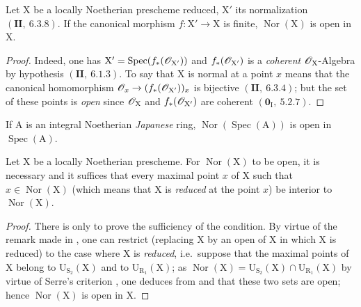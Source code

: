 \begin{proposition}[6.13.2]
\label{IV.6.13.2}
Let $\mathrm{X}$ be a locally Noetherian prescheme reduced, $\mathrm{X}'$ its
normalization $(\mathbf{II},~6.3.8)$. If the canonical morphism $f:\mathrm{X}'\to\mathrm{X}$ is finite, $\operatorname{Nor}(\mathrm{X})$ is open in $\mathrm{X}$.
\end{proposition}

\begin{proof}
Indeed, one has $\mathrm{X}'=\operatorname{Spec}(f_*(\mathscr{O}_{\mathrm{X}'}))$ and $f_*(\mathscr{O}_{\mathrm{X}'})$ is a \emph{coherent} $\mathscr{O}_\mathrm{X}$-Algebra by
hypothesis $(\mathbf{II},~6.1.3)$. To say that $\mathrm{X}$ is normal at a point $x$ means that the canonical
homomorphism $\mathscr{O}_x\to(f_*(\mathscr{O}_{\mathrm{X}'}))_x$ is bijective $(\mathbf{II},~6.3.4)$; but the set of these points is \emph{open}
since $\mathscr{O}_\mathrm{X}$ and $f_*(\mathscr{O}_{\mathrm{X}'})$ are coherent $(\mathbf{0}_\mathrm{I},~5.2.7)$.
\end{proof}

\begin{corollary}[6.13.3]
\label{IV.6.13.3}
If $\mathrm{A}$ is an integral Noetherian \emph{Japanese} ring, $\operatorname{Nor}(\operatorname{Spec}(\mathrm{A}))$
is open in $\operatorname{Spec}(\mathrm{A})$.
\end{corollary}

\begin{proposition}[6.13.4]
\label{IV.6.13.4}
Let $\mathrm{X}$ be a locally Noetherian prescheme. For $\operatorname{Nor}(\mathrm{X})$
to be open, it is necessary and it suffices that every maximal point $x$ of $\mathrm{X}$ such that $x\in\operatorname{Nor}(\mathrm{X})$ \textup{(which means
that $\mathrm{X}$ is \emph{reduced} at the point $x$)} be interior to $\operatorname{Nor}(\mathrm{X})$.
\end{proposition}

\begin{proof}
There is only to prove the sufficiency of the condition. By virtue of the remark made
in , one can restrict (replacing $\mathrm{X}$ by an open of $\mathrm{X}$ in which $\mathrm{X}$
is reduced) to the case where $\mathrm{X}$ is \emph{reduced}, i.e.\ suppose that the maximal points of $\mathrm{X}$ belong
to $\mathrm{U}_{\mathrm{S}_2}(\mathrm{X})$ and to $\mathrm{U}_{\mathrm{R}_1}(\mathrm{X})$; as $\operatorname{Nor}(\mathrm{X})=\mathrm{U}_{\mathrm{S}_2}(\mathrm{X})\cap\mathrm{U}_{\mathrm{R}_1}(\mathrm{X})$ by virtue of Serre's
criterion , one deduces from  and  that these two sets are
open; hence $\operatorname{Nor}(\mathrm{X})$ is open in $\mathrm{X}$.
\end{proof}

